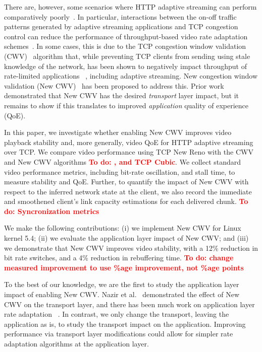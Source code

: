 \documentclass[10pt, acmlarge]{acmart}
\newcommand{\todo}[1]{\textbf{\textcolor{red}{To do: #1}}}
\begin{document}
There are, however, some scenarios where HTTP adaptive streaming can perform comparatively
 poorly~\cite{Spiteri-2016-BOLA,Kua-2017-a-survey-rate-adaptation-dash}.
  In particular, interactions between the on-off traffic patterns generated by adaptive 
  streaming applications and TCP congestion control can reduce the performance of 
  throughput-based video rate adaptation 
  schemes~\cite{Akhshabi-2012-http-adaptive-players-compete,
  Stohr-2017-where-are-the-sweet-spots-maci}. 
  In some cases, this is due to the TCP congestion window validation 
  (CWV)~\cite{rfc2861-2000-padhye-congestion-window-validation} 
  algorithm that, while preventing TCP clients from sending using stale 
  knowledge of the network, has been shown to negatively impact throughput of 
  rate-limited applications
  ~\cite{Nazir-2014-performance-evaluation-congestion-window-validation-dash-newcwv},
   including adaptive streaming. New congestion window validation 
   (New CWV)~\cite{rfc7661-2015-fairhurst-new-cwnd-validation} 
   has been proposed to address this. Prior work
   ~\cite{Nazir-2014-performance-evaluation-congestion-window-validation-dash-newcwv}
    demonstrated that New CWV has the desired \emph{transport} layer impact, 
    but it remains to show if this translates to improved \emph{application} 
    quality of experience (QoE). 

In this paper, we investigate whether enabling New CWV improves video playback stability and,
 more generally, video QoE for HTTP adaptive streaming over TCP.
  We compare video performance using TCP New Reno with the CWV and New CWV algorithms
  \todo{, and TCP Cubic}. We collect standard video performance metrics, 
  including bit-rate oscillation, and stall time, to measure stability and QoE.
   Further, to quantify the impact of New CWV with respect to the inferred network state 
   at the client, we also record the immediate and smoothened client's link capacity 
   estimations for each delivered chunk. \todo{Syncronization metrics}

We make the following contributions: (i) we implement New CWV for Linux kernel 5.4;
 (ii) we evaluate the application layer impact of New CWV;
  and (iii) we demonstrate that New CWV improves video stability, with a 12\% reduction 
  in bit rate switches, and a 4\% reduction in rebuffering time.
\todo{change measured improvement to use \%age improvement, not \%age points}


To the best of our knowledge, we are the first to study the application
layer impact of enabling New CWV. 
Nazir et al.~\cite{Nazir-2014-performance-evaluation-congestion-window-validation-dash-newcwv}
demonstrated the effect of New CWV on the transport layer, 
and there has been much work on application layer rate adaptation
~\cite{Mok-2012-qdash,Huang-2015-A-buffer-based-approach-to-rate-adaptation-bba,
 Yin-2015-a-control-theoritic-approach}. In contrast, we only change the transport,
  leaving the application as is, to study the transport impact on the application.
   Improving performance via transport layer modifications could allow for simpler 
   rate adaptation algorithms at the application layer.
\end{document}
